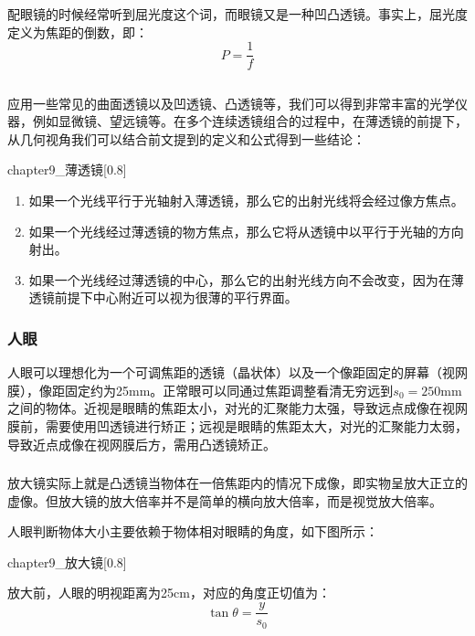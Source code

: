配眼镜的时候经常听到屈光度这个词，而眼镜又是一种凹凸透镜。事实上，屈光度定义为焦距的倒数，即：
\[P = \dfrac{1}{f}\]

\subsection[几何光学的应用]{}

应用一些常见的曲面透镜以及凹透镜、凸透镜等，我们可以得到非常丰富的光学仪器，例如显微镜、望远镜等。在多个连续透镜组合的过程中，在薄透镜的前提下，从几何视角我们可以结合前文提到的定义和公式得到一些结论：
\begin{singlefigure}[薄透镜成像]{chapter9_薄透镜}[0.8]
\end{singlefigure}
\begin{enumerate}
    \item 如果一个光线平行于光轴射入薄透镜，那么它的出射光线将会经过像方焦点。
    \item 如果一个光线经过薄透镜的物方焦点，那么它将从透镜中以平行于光轴的方向射出。
    \item 如果一个光线经过薄透镜的中心，那么它的出射光线方向不会改变，因为在薄透镜前提下中心附近可以视为很薄的平行界面。
\end{enumerate}
\subsubsection[人眼]{人眼}
人眼可以理想化为一个可调焦距的透镜（晶状体）以及一个像距固定的屏幕（视网膜），像距固定约为25mm。正常眼可以同通过焦距调整看清无穷远到$s_0 = 250$mm之间的物体。近视是眼睛的焦距太小，对光的汇聚能力太强，导致远点成像在视网膜前，需要使用凹透镜进行矫正；远视是眼睛的焦距太大，对光的汇聚能力太弱，导致近点成像在视网膜后方，需用凸透镜矫正。

\subsubsection[放大镜]{}
放大镜实际上就是凸透镜当物体在一倍焦距内的情况下成像，即实物呈放大正立的虚像。但放大镜的放大倍率并不是简单的横向放大倍率，而是视觉放大倍率。

人眼判断物体大小主要依赖于物体相对眼睛的角度，如下图所示：
\begin{singlefigure}[放大镜示意图]{chapter9_放大镜}[0.8]
\end{singlefigure}

放大前，人眼的明视距离为25cm，对应的角度正切值为：
\[\tan \theta = \dfrac{y}{s_0}\]

